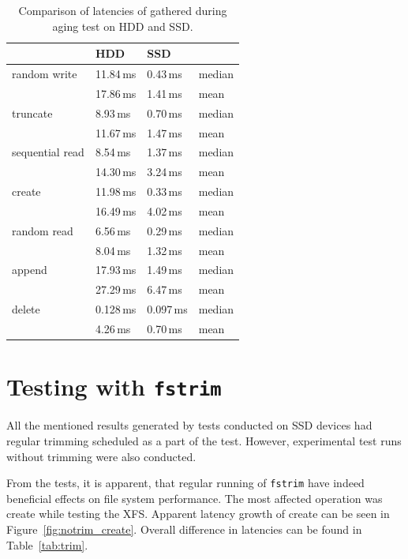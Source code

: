 \documentclass[
  color, %
  table, %
  lof,   %
  lot,   %
]{fithesis3}
\begin{document}
\begin{table}
\centering
\begin{tabular}{|l|l|l|l|}
\hline
 &HDD & SSD &  \\
\hline
    random write & 11.84\,ms & 0.43\,ms & median \\
 \hline
                 & 17.86\,ms & 1.41\,ms & mean\\
    \hline
        truncate & 8.93\,ms & 0.70\,ms & median\\
    \hline
                 & 11.67\,ms & 1.47\,ms & mean \\
    \hline
           sequential read & 8.54\,ms & 1.37\,ms & median\\
    \hline
                 & 14.30\,ms & 3.24\,ms & mean \\
    \hline
          create & 11.98\,ms & 0.33\,ms & median\\
    \hline
                 & 16.49\,ms & 4.02\,ms & mean \\
    \hline
     random read & 6.56\,ms & 0.29\,ms & median\\
    \hline
                 & 8.04\,ms & 1.32\,ms & mean \\
    \hline
          append & 17.93\,ms & 1.49\,ms & median\\
    \hline
                 & 27.29\,ms & 6.47\,ms & mean \\
    \hline
          delete & 0.128\,ms & 0.097\,ms & median\\
    \hline
                & 4.26\,ms & 0.70\,ms & mean \\
    \hline
\end{tabular}
\caption{Comparison of latencies of gathered during aging test on HDD and SSD.}
\label{tab:ssd_hdd_xfs}
\end{table}

\section{Testing with \texttt{fstrim}}
All the mentioned results generated by tests conducted on SSD devices had regular trimming scheduled as a part of the test. However, experimental test runs without trimming were also conducted. 

From the tests, it is apparent, that regular running of \texttt{fstrim} have indeed beneficial effects on file system performance. The most affected operation was create while testing the XFS. Apparent latency growth of create can be seen in Figure~\ref{fig:notrim_create}. Overall difference in latencies can be found in Table~\ref{tab:trim}.
\end{document}
